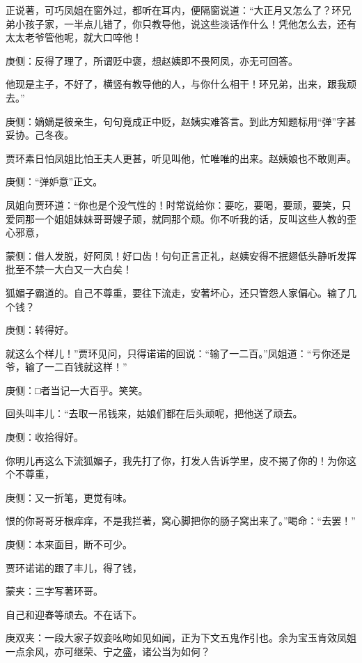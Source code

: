 \begin{parag}
    正说著，可巧凤姐在窗外过，都听在耳内，便隔窗说道：“大正月又怎么了？环兄弟小孩子家，一半点儿错了，你只教导他，说这些淡话作什么！凭他怎么去，还有太太老爷管他呢，就大口啐他！\begin{note}庚侧：反得了理了，所谓贬中褒，想赵姨即不畏阿凤，亦无可回答。\end{note}他现是主子，不好了，横竖有教导他的人，与你什么相干！环兄弟，出来，跟我顽去。”\begin{note}庚侧：嫡嫡是彼亲生，句句竟成正中贬，赵姨实难答言。到此方知题标用“弹”字甚妥协。己冬夜。\end{note}贾环素日怕凤姐比怕王夫人更甚，听见叫他，忙唯唯的出来。赵姨娘也不敢则声。\begin{note}庚侧：“弹妒意”正文。\end{note}凤姐向贾环道：“你也是个没气性的！时常说给你：要吃，要喝，要顽，要笑，只爱同那一个姐姐妹妹哥哥嫂子顽，就同那个顽。你不听我的话，反叫这些人教的歪心邪意，\begin{note}蒙侧：借人发脱，好阿凤！好口齿！句句正言正礼，赵姨安得不抿翅低头静听发挥批至不禁一大白又一大白矣！\end{note}狐媚子霸道的。自己不尊重，要往下流走，安著坏心，还只管怨人家偏心。输了几个钱？\begin{note}庚侧：转得好。\end{note}就这么个样儿！”贾环见问，只得诺诺的回说：“输了一二百。”凤姐道：“亏你还是爷，输了一二百钱就这样！”\begin{note}庚侧：□者当记一大百乎。笑笑。\end{note}回头叫丰儿：“去取一吊钱来，姑娘们都在后头顽呢，把他送了顽去。\begin{note}庚侧：收拾得好。\end{note}你明儿再这么下流狐媚子，我先打了你，打发人告诉学里，皮不揭了你的！为你这个不尊重，\begin{note}庚侧：又一折笔，更觉有味。\end{note}恨的你哥哥牙根痒痒，不是我拦著，窝心脚把你的肠子窝出来了。”喝命：“去罢！”\begin{note}庚侧：本来面目，断不可少。\end{note}贾环诺诺的跟了丰儿，得了钱，\begin{note}蒙夹：三字写著环哥。\end{note}自己和迎春等顽去。不在话下。\begin{note}庚双夹：一段大家子奴妾吆吻如见如闻，正为下文五鬼作引也。余为宝玉肯效凤姐一点余风，亦可继荣、宁之盛，诸公当为如何？\end{note}
\end{parag}


